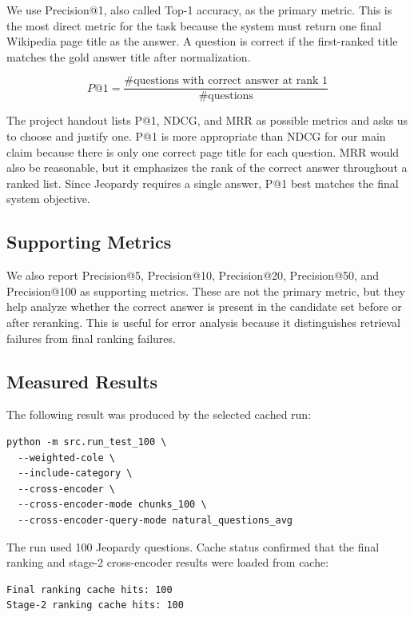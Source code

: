 \documentclass[11pt]{article}
\begin{document}
We use Precision@1, also called Top-1 accuracy, as the primary metric. This is the most direct metric for the task because the system must return one final Wikipedia page title as the answer. A question is correct if the first-ranked title matches the gold answer title after normalization.

\[
P@1 = \frac{\# \text{questions with correct answer at rank 1}}{\# \text{questions}}
\]

The project handout lists P@1, NDCG, and MRR as possible metrics and asks us to choose and justify one. P@1 is more appropriate than NDCG for our main claim because there is only one correct page title for each question. MRR would also be reasonable, but it emphasizes the rank of the correct answer throughout a ranked list. Since Jeopardy requires a single answer, P@1 best matches the final system objective.

\subsection{Supporting Metrics}

We also report Precision@5, Precision@10, Precision@20, Precision@50, and Precision@100 as supporting metrics. These are not the primary metric, but they help analyze whether the correct answer is present in the candidate set before or after reranking. This is useful for error analysis because it distinguishes retrieval failures from final ranking failures.

\subsection{Measured Results}

The following result was produced by the selected cached run:

\begin{verbatim}
python -m src.run_test_100 \
  --weighted-cole \
  --include-category \
  --cross-encoder \
  --cross-encoder-mode chunks_100 \
  --cross-encoder-query-mode natural_questions_avg
\end{verbatim}

The run used 100 Jeopardy questions. Cache status confirmed that the final ranking and stage-2 cross-encoder results were loaded from cache:

\begin{verbatim}
Final ranking cache hits: 100
Stage-2 ranking cache hits: 100
\end{verbatim}
\end{document}
